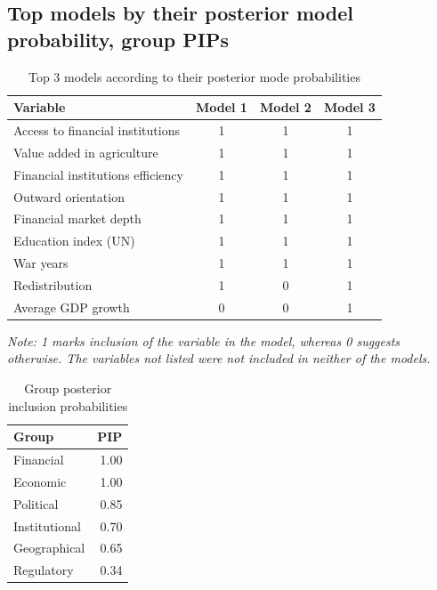 \begin{refsection}
\begin{subappendices}
    \section{Top models by their posterior model probability, group \acp{PIP}}
    \begin{table}[!htbp]
    \centering
    \caption{Top 3 models according to their posterior mode probabilities}
    \label{ch3table:top3}
    \begin{threeparttable}
    \begin{tabularx}{0.7\linewidth}{lccc}
      \toprule
    Variable & Model 1 & Model 2 & Model 3 \\ 
      \midrule
    Access to financial institutions & 1 & 1 & 1 \\
    Value added in agriculture & 1 & 1 & 1 \\ 
    Financial institutions efficiency & 1 & 1 & 1 \\
    Outward orientation & 1 & 1 & 1 \\
    Financial market depth & 1 & 1 & 1 \\
    Education index (UN) & 1 & 1 & 1 \\
    War years & 1 & 1 & 1 \\
    Redistribution & 1 & 0 & 1 \\
    Average GDP growth & 0 & 0 & 1 \\
      \bottomrule
    \end{tabularx}
    \begin{tablenotes}
    \footnotesize													
    \item \textit{Note: 1 marks inclusion of the variable in the model, whereas 0 suggests otherwise. The variables not listed were not included in neither of the models.}
    \end{tablenotes}
    \end{threeparttable}
    \end{table}			
    
    \begin{table}[ht!]
    \caption{Group posterior inclusion probabilities}
    \label{ch3tab:grouppips}
    \centering
    \begin{tabular}{lr}
      \toprule
    Group & \ac{PIP} \\ 
      \midrule
      Financial & 1.00 \\ 
      Economic & 1.00 \\ 
      Political & 0.85 \\ 
      Institutional & 0.70 \\ 
      Geographical & 0.65 \\ 
      Regulatory & 0.34 \\ 
       \bottomrule
    \end{tabular}
    \end{table}
    \clearpage
    

\end{subappendices}
\end{refsection}
